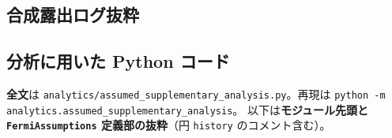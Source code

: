 \documentclass[11pt,a4paper]{article}
\begin{document}
\FloatBarrier


\FloatBarrier
\subsection{合成露出ログ抜粋}


\FloatBarrier
\subsection{分析に用いた Python コード}
\noindent
\textbf{全文}は \texttt{analytics/assumed\_supplementary\_analysis.py}。再現は \texttt{python -m analytics.assumed\_supplementary\_analysis}。
以下は\textbf{モジュール先頭と \texttt{FermiAssumptions} 定義部の抜粋}（円 \texttt{history} のコメント含む）。

\FloatBarrier

\end{document}
